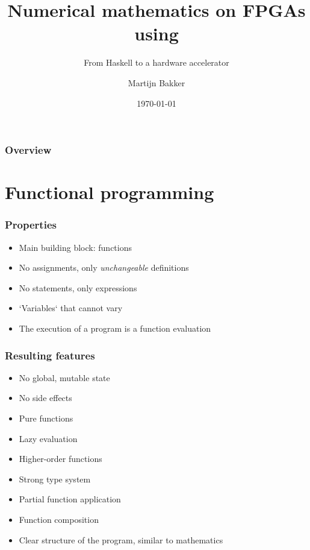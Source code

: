 \documentclass{beamer}[10]
\title{Numerical mathematics on FPGAs using \clash{}}
\subtitle{From Haskell to a hardware accelerator}
\author{Martijn Bakker}
\institute{Computer Architecture for Embedded Systems (CAES) \\ University of Twente}
\date{\today{}}
\begin{document}
\begin{frame}
\titlepage
\end{frame} 

\begin{frame}
\frametitle{Overview}
\tableofcontents
\end{frame} 

\section{Functional programming}

\begin{frame}
	\frametitle{Properties}

	\begin{itemize}
	\item Main building block: functions
	\vspace{15pt}
	\item No assignments, only \emph{unchangeable} definitions
	\item No statements, only expressions
	\item `Variables` that cannot vary
	\vspace{15pt}
	\item The execution of a program is a function evaluation
	\end{itemize}
\end{frame}

\begin{frame}
	\frametitle{Resulting features}
	
	\begin{itemize}
		\item No global, mutable state
		\item No side effects
		\item Pure functions
	\end{itemize}
	\begin{itemize}
		\item Lazy evaluation
		\item Higher-order functions
		\item Strong type system
		\item Partial function application
		\item Function composition
		
		\vspace{15pt}
		\item Clear structure of the program, similar to mathematics
	\end{itemize}
\end{frame}
\end{document}
